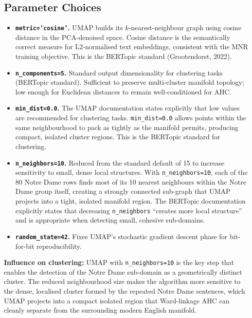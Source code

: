\documentclass[11pt, a4paper]{article}
\begin{document}
\subsection{Parameter Choices}

\begin{itemize}
  \item \textbf{\texttt{metric='cosine'}.}  UMAP builds its $k$-nearest-neighbour
        graph using cosine distance in the PCA-denoised space.  Cosine
        distance is the semantically correct measure for L2-normalised text
        embeddings, consistent with the MNR training objective.  This is the
        BERTopic standard (Grootendorst, 2022).

  \item \textbf{\texttt{n\_components=5}.}  Standard output dimensionality for
        clustering tasks (BERTopic standard).  Sufficient to preserve
        multi-cluster manifold topology; low enough for Euclidean distances to
        remain well-conditioned for AHC.

  \item \textbf{\texttt{min\_dist=0.0}.}  The UMAP documentation states
        explicitly that low values are recommended for clustering tasks.
        \texttt{min\_dist=0.0} allows points within the same neighbourhood to
        pack as tightly as the manifold permits, producing compact, isolated
        cluster regions.  This is the BERTopic standard for clustering.

  \item \textbf{\texttt{n\_neighbors=10}.}  Reduced from the standard default
        of 15 to increase sensitivity to small, dense local structures.  With
        \texttt{n\_neighbors=10}, each of the 80 Notre Dame rows finds most of
        its 10 nearest neighbours within the Notre Dame group itself, creating
        a strongly connected sub-graph that UMAP projects into a tight,
        isolated manifold region.  The BERTopic documentation explicitly states
        that decreasing \texttt{n\_neighbors} ``creates more local structure''
        and is appropriate when detecting small, cohesive sub-domains.

  \item \textbf{\texttt{random\_state=42}.}  Fixes UMAP's stochastic gradient
        descent phase for bit-for-bit reproducibility.
\end{itemize}

\begin{insightbox}
\textbf{Influence on clustering:} UMAP with \texttt{n\_neighbors=10} is the
key step that enables the detection of the Notre Dame sub-domain as a
geometrically distinct cluster.  The reduced neighbourhood size makes the
algorithm more sensitive to the dense, localised cluster formed by the
repeated Notre Dame sentences, which UMAP projects into a compact isolated
region that Ward-linkage AHC can cleanly separate from the surrounding
modern English manifold.
\end{insightbox}
\end{document}
